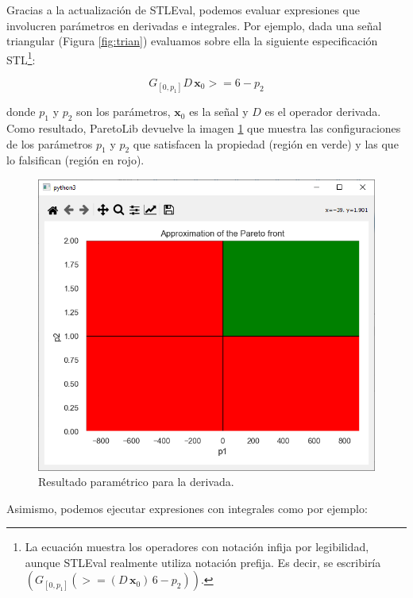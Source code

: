 Gracias a la actualización de STLEval, podemos evaluar expresiones que involucren parámetros en derivadas e integrales. Por ejemplo, dada una señal triangular (Figura \ref{fig:trian}) evaluamos sobre ella la siguiente especificación STL\footnote{La ecuación muestra los operadores con notación infija por legibilidad, aunque STLEval realmente utiliza notación prefija. Es decir, se escribiría $(G_{[0,p_1]} (>= (D\, \mathbf{x}_0) \, 6 - p_2))$.}:


$$G_{[0,p_1]} D\, \mathbf{x}_0 >= 6 - p_2$$ 

donde $p_1$ y $p_2$ son los parámetros, $\mathbf{x}_0$ es la señal y $D$ es el operador derivada.
Como resultado, ParetoLib devuelve la imagen \ref{fig:param_derivative} que muestra las configuraciones de los parámetros $p_1$ y $p_2$ que satisfacen la propiedad (región en verde) y las que lo falsifican (región en rojo). %

\begin{figure}[htb]
\centering
  \includegraphics[width=0.7\linewidth]{images/stl_parametrico_der} 
\caption{Resultado paramétrico para la derivada.}
\label{fig:param_derivative}
\end{figure}


Asimismo, podemos ejecutar expresiones con integrales como por ejemplo:


